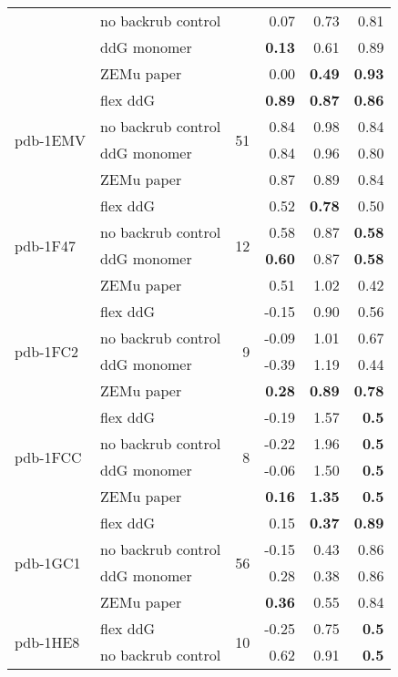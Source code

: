 \begin{longtable}{llrrrr}
 & no backrub control & & 0.07 & 0.73 & 0.81  \\
 & ddG monomer & & \textbf{0.13} & 0.61 & 0.89  \\
 & ZEMu paper & & 0.00 & \textbf{0.49} & \textbf{0.93}  \\
\hline
 \multirow{ 4}{*}{pdb-1EMV} & flex ddG & \multirow{ 4}{*}{51} & \textbf{0.89} & \textbf{0.87} & \textbf{0.86}  \\
 & no backrub control & & 0.84 & 0.98 & 0.84  \\
 & ddG monomer & & 0.84 & 0.96 & 0.80  \\
 & ZEMu paper & & 0.87 & 0.89 & 0.84  \\
\hline
 \multirow{ 4}{*}{pdb-1F47} & flex ddG & \multirow{ 4}{*}{12} & 0.52 & \textbf{0.78} & 0.50  \\
 & no backrub control & & 0.58 & 0.87 & \textbf{0.58}  \\
 & ddG monomer & & \textbf{0.60} & 0.87 & \textbf{0.58}  \\
 & ZEMu paper & & 0.51 & 1.02 & 0.42  \\
\hline
 \multirow{ 4}{*}{pdb-1FC2} & flex ddG & \multirow{ 4}{*}{9} & -0.15 & 0.90 & 0.56  \\
 & no backrub control & & -0.09 & 1.01 & 0.67  \\
 & ddG monomer & & -0.39 & 1.19 & 0.44  \\
 & ZEMu paper & & \textbf{0.28} & \textbf{0.89} & \textbf{0.78}  \\
\hline
 \multirow{ 4}{*}{pdb-1FCC} & flex ddG & \multirow{ 4}{*}{8} & -0.19 & 1.57 & \textbf{0.5}  \\
 & no backrub control & & -0.22 & 1.96 & \textbf{0.5}  \\
 & ddG monomer & & -0.06 & 1.50 & \textbf{0.5}  \\
 & ZEMu paper & & \textbf{0.16} & \textbf{1.35} & \textbf{0.5}  \\
\hline
 \multirow{ 4}{*}{pdb-1GC1} & flex ddG & \multirow{ 4}{*}{56} & 0.15 & \textbf{0.37} & \textbf{0.89}  \\
 & no backrub control & & -0.15 & 0.43 & 0.86  \\
 & ddG monomer & & 0.28 & 0.38 & 0.86  \\
 & ZEMu paper & & \textbf{0.36} & 0.55 & 0.84  \\
\hline
 \multirow{ 4}{*}{pdb-1HE8} & flex ddG & \multirow{ 4}{*}{10} & -0.25 & 0.75 & \textbf{0.5}  \\
 & no backrub control & & 0.62 & 0.91 & \textbf{0.5}  \\

\end{longtable}
